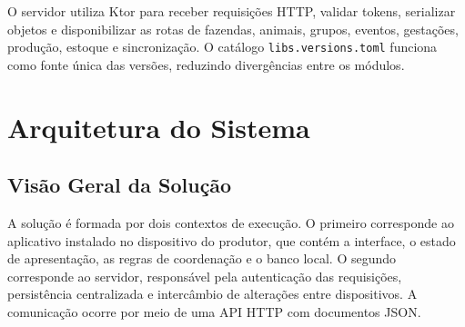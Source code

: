 O servidor utiliza Ktor para receber requisições HTTP, validar tokens, serializar objetos e disponibilizar as rotas de fazendas, animais, grupos, eventos, gestações, produção, estoque e sincronização. O catálogo \texttt{libs.versions.toml} funciona como fonte única das versões, reduzindo divergências entre os módulos.

\section{Arquitetura do Sistema}
\label{sec:desenvolvimento-arquitetura}

\subsection{Visão Geral da Solução}
\label{subsec:arquitetura-visao-geral}

A solução é formada por dois contextos de execução. O primeiro corresponde ao aplicativo instalado no dispositivo do produtor, que contém a interface, o estado de apresentação, as regras de coordenação e o banco local. O segundo corresponde ao servidor, responsável pela autenticação das requisições, persistência centralizada e intercâmbio de alterações entre dispositivos. A comunicação ocorre por meio de uma API HTTP com documentos JSON.

\begin{figure}[htb]
    \centering
\end{figure}

